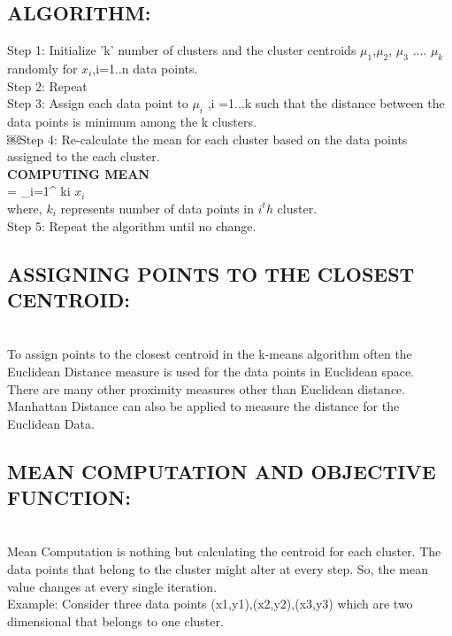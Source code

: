 \documentclass[11pt]{article}
\begin{document}
\subsection{ALGORITHM:}

Step 1: Initialize 'k' number of clusters and the cluster centroids $ \mu_1 $,$ \mu_2 $, $ \mu_3 $ .... $ \mu_k $ randomly for $ x_i $,i=1..n data points.\\
Step 2: Repeat\\
Step 3: Assign each data point to $ \mu_i $ ,i =1...k such that the distance between the data points is minimum among the k clusters.\\
￼Step 4: Re-calculate the mean for each cluster based on the data points assigned to the each cluster.\\

\textbf{COMPUTING MEAN}\\

\mu =  \sum_{i=1}^{ ki } $x_i$ \\


where, $ k_i $ represents number of data points in $ i^th $ cluster.\\

Step 5: Repeat the algorithm until no change.\\

\subsection{ASSIGNING POINTS TO THE CLOSEST CENTROID:}\\
To assign points to the closest centroid in the k-means algorithm often the Euclidean Distance measure is used for the data points in Euclidean space.\\
There are many other proximity measures other than Euclidean distance. Manhattan Distance can also be applied to measure the distance for the Euclidean Data. \\

\subsection{MEAN COMPUTATION AND OBJECTIVE FUNCTION:}\\
Mean Computation is nothing but calculating the centroid for each cluster. The data points that belong to the cluster might alter at every step. So, the mean value changes at every single iteration.\\
Example: Consider three data points (x1,y1),(x2,y2),(x3,y3) which are two dimensional that belongs to one cluster.\\
\end{document}
